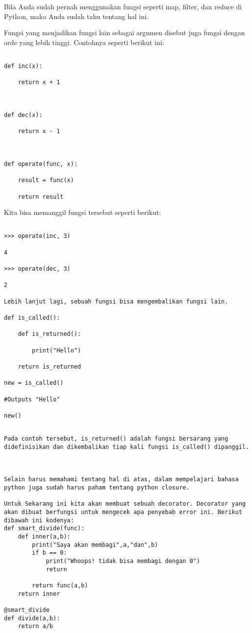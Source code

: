 Bila Anda sudah pernah menggunakan fungsi seperti map, filter, dan reduce di Python, maka Anda sudah tahu tentang hal ini.

Fungsi yang menjadikan fungsi lain sebagai argumen disebut juga fungsi dengan orde yang lebih tinggi. Contohnya seperti berikut ini:



\begin{verbatim}

def inc(x):

    return x + 1

    

def dec(x):

    return x - 1

    

def operate(func, x):

    result = func(x)

    return result

\end{verbatim}





Kita bisa memanggil fungsi tersebut seperti berikut:



\begin{verbatim}

>>> operate(inc, 3)

4

>>> operate(dec, 3)

2

Lebih lanjut lagi, sebuah fungsi bisa mengembalikan fungsi lain.

def is_called():

    def is_returned():

        print("Hello")

    return is_returned

new = is_called()

#Outputs "Hello"

new()

\end{verbatim}



\begin{verbatim}

Pada contoh tersebut, is_returned() adalah fungsi bersarang yang didefinisikan dan dikembalikan tiap kali fungsi is_called() dipanggil.



Selain harus memahami tentang hal di atas, dalam mempelajari bahasa python juga sudah harus paham tentang python closure.

Untuk Sekarang ini kita akan membuat sebuah decorator. Decorator yang akan dibuat berfungsi untuk mengecek apa penyebab error ini. Berikut dibawah ini kodenya:
def smart_divide(func):
    def inner(a,b):
        print("Saya akan membagi",a,"dan",b)
        if b == 0:
            print("Whoops! tidak bisa membagi dengan 0")
            return

        return func(a,b)
    return inner

@smart_divide
def divide(a,b):
    return a/b
\end{verbatim}

